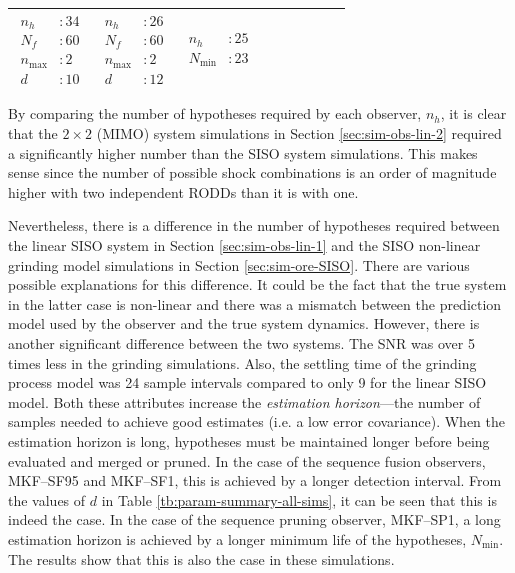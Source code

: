 \begin{table}[ht]
\begin{center}
\begin{tabular}{
				l
				|
				c
				c
				c
				c
				c
				|
				>{\centering\arraybackslash}p{0.9in}
				>{\centering\arraybackslash}p{0.8in}
				>{\centering\arraybackslash}p{0.8in}
			}
			$\begin{aligned} n_h & :34 \\ N_f & :60 \\ n_\text{max} & :2 \\ d & :10 \end{aligned}$ & 
			$\begin{aligned} n_h & :26 \\ N_f & :60 \\ n_\text{max} & :2 \\ d & :12 \end{aligned}$ & 
			$\begin{aligned} n_h & :25 \\ N_\text{min} & :23 \end{aligned}$ \\
			\hline
		\end{tabular}
	\end{center}
\end{table}

By comparing the number of hypotheses required by each observer, $n_h$, it is clear that the $2 \times 2$ (\gls{MIMO}) system simulations in Section \ref{sec:sim-obs-lin-2} required a significantly higher number than the \gls{SISO} system simulations. This makes sense since the number of possible shock combinations is an order of magnitude higher with two independent \gls{RODD}s than it is with one.

Nevertheless, there is a difference in the number of hypotheses required between the linear \gls{SISO} system in Section \ref{sec:sim-obs-lin-1} and the \gls{SISO} non-linear grinding model simulations in Section \ref{sec:sim-ore-SISO}. There are various possible explanations for this difference. It could be the fact that the true system in the latter case is non-linear and there was a mismatch between the prediction model used by the observer and the true system dynamics. However, there is another significant difference between the two systems. The \gls{SNR} was over 5 times less in the grinding simulations. Also, the settling time of the grinding process model was 24 sample intervals compared to only 9 for the linear \gls{SISO} model. Both these attributes increase the \textit{estimation horizon}---the number of samples needed to achieve good estimates (i.e. a low error covariance). When the estimation horizon is long, hypotheses must be maintained longer before being evaluated and merged or pruned. In the case of the sequence fusion observers, MKF--SF95 and MKF--SF1, this is achieved by a longer detection interval. From the values of $d$ in Table \ref{tb:param-summary-all-sims}, it can be seen that this is indeed the case. In the case of the sequence pruning observer, MKF--SP1, a long estimation horizon is achieved by a longer minimum life of the hypotheses, $N_\text{min}$. The results show that this is also the case in these simulations.

